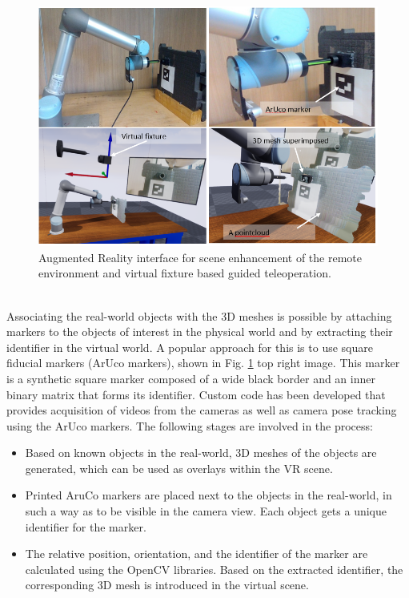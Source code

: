 \begin{figure}[h]
    \centering
    \includegraphics[scale=0.5]{images/Aruco_AR.PNG}
    \caption{Augmented Reality  interface  for  scene enhancement of the remote environment and virtual fixture based guided teleoperation.}
    \label{fig:Aruco_AR}
\end{figure}\\


Associating the real-world objects with the 3D meshes is possible by attaching markers to the objects of  interest  in  the  physical  world  and  by  extracting  their  identifier  in  the virtual  world.  A  popular  approach  for  this  is  to  use  square  fiducial  markers  (ArUco  markers),  shown  in  Fig. \ref{fig:Aruco_AR} top right  image.  This  marker is a synthetic square marker composed of a wide black border and an inner binary matrix that forms its identifier. Custom code has been developed that provides acquisition of videos from the cameras as well as camera pose tracking using the ArUco markers. The following stages are involved in the process:

\begin{itemize}
    \item Based on known objects in the real-world, 3D meshes of the objects are generated, which can be used as overlays within the VR scene. 
    \item Printed AruCo markers are placed next to the objects in the real-world, in such a way as to be visible in the camera view. Each object gets a unique identifier for the marker.
    \item The  relative  position,  orientation,  and  the  identifier  of  the  marker  are  calculated  using  the  OpenCV libraries. Based on the extracted identifier, the corresponding 3D mesh is introduced in the virtual scene. 
\end{itemize}


